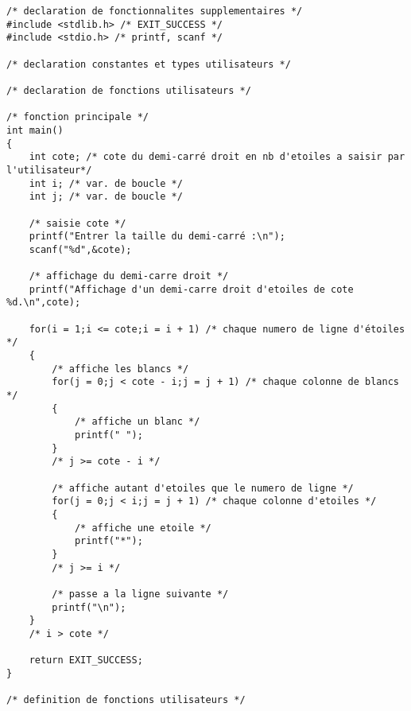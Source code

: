 \begin{correction}
\begin{verbatim}
/* declaration de fonctionnalites supplementaires */
#include <stdlib.h> /* EXIT_SUCCESS */
#include <stdio.h> /* printf, scanf */

/* declaration constantes et types utilisateurs */

/* declaration de fonctions utilisateurs */

/* fonction principale */
int main()
{
    int cote; /* cote du demi-carré droit en nb d'etoiles a saisir par l'utilisateur*/
    int i; /* var. de boucle */
    int j; /* var. de boucle */

    /* saisie cote */
    printf("Entrer la taille du demi-carré :\n");
    scanf("%d",&cote);

    /* affichage du demi-carre droit */
    printf("Affichage d'un demi-carre droit d'etoiles de cote %d.\n",cote);

    for(i = 1;i <= cote;i = i + 1) /* chaque numero de ligne d'étoiles */
    {
        /* affiche les blancs */
        for(j = 0;j < cote - i;j = j + 1) /* chaque colonne de blancs */
        {
            /* affiche un blanc */
            printf(" ");
        }
        /* j >= cote - i */

        /* affiche autant d'etoiles que le numero de ligne */
        for(j = 0;j < i;j = j + 1) /* chaque colonne d'etoiles */
        {
            /* affiche une etoile */
            printf("*");
        }
        /* j >= i */

        /* passe a la ligne suivante */
        printf("\n");
    }
    /* i > cote */

    return EXIT_SUCCESS;
}

/* definition de fonctions utilisateurs */

\end{verbatim}
\end{correction}

